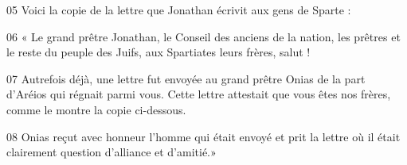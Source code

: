 
05 Voici la copie de la lettre que Jonathan écrivit aux gens de Sparte :

06 « Le grand prêtre Jonathan, le Conseil des anciens de la nation, les prêtres et le reste du peuple des Juifs, aux Spartiates leurs frères, salut !

07 Autrefois déjà, une lettre fut envoyée au grand prêtre Onias de la part d’Aréios qui régnait parmi vous. Cette lettre attestait que vous êtes nos frères, comme le montre la copie ci-dessous.

08 Onias reçut avec honneur l’homme qui était envoyé et prit la lettre où il était clairement question d’alliance et d’amitié.»
